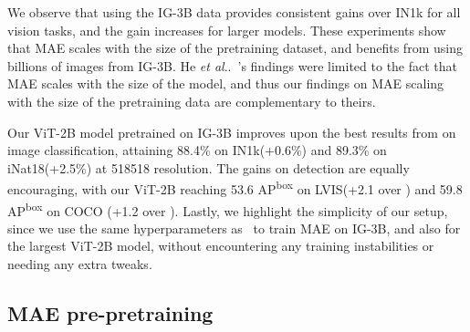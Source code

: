 \documentclass[10pt,twocolumn,letterpaper]{article}
\makeatletter
\DeclareRobustCommand\onedot{\futurelet\@let@token\@onedot}
\def\@onedot{\ifx\@let@token.\else.\null\fi\xspace}
\def\etal{\emph{et al}\onedot}
\newcommand{\prept}{pre-pretraining\xspace}
\newcommand{\mae}{MAE\xspace}
\newcommand{\vitTwoB}{ViT-2B\xspace}
\newcommand{\igSizeShort}{IG-3B\xspace}
\newcommand{\inetOneKShort}{IN1k\xspace}
\newcommand{\inatShort}{iNat18\xspace}
\newcommand{\cocoShort}{COCO\xspace}
\newcommand{\lvisShort}{LVIS\xspace}
\makeatother
\begin{document}
We observe that using the \igSizeShort data provides consistent gains over \inetOneKShort for all vision tasks, and the gain increases for larger models.
These experiments show that \mae scales with the size of the pretraining dataset, and benefits from using billions of images from \igSizeShort.
He \etal~\cite{he2021masked}'s findings were limited to the fact that \mae scales with the size of the model, and thus our findings on \mae scaling with the size of the pretraining data are complementary to theirs.

Our \vitTwoB model pretrained on \igSizeShort improves upon the best results from \cite{he2021masked} on image classification,
attaining 88.4\% on \inetOneKShort (+0.6\%) and 89.3\% on \inatShort (+2.5\%) at 518518 resolution. 
The gains on detection are equally encouraging, with our \vitTwoB
reaching 53.6 AP\textsuperscript{box} on \lvisShort  (+2.1 over \cite{he2021masked}) and 59.8 AP\textsuperscript{box} on \cocoShort
(+1.2 over \cite{he2021masked}).
Lastly, we highlight the simplicity of our setup, since we use the same hyperparameters as~\cite{he2021masked} to train \mae on 
\igSizeShort, and also for the largest \vitTwoB model, without encountering any training instabilities or needing any extra tweaks.


\subsection{\mae \prept}
\label{sec:pretraining}
\end{document}
